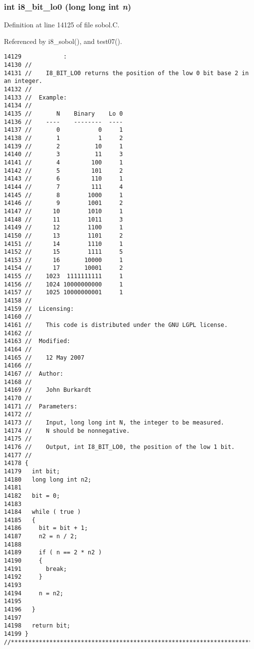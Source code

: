 \subsubsection{\setlength{\rightskip}{0pt plus 5cm}int i8\_\-bit\_\-lo0 (long long int {\em n})}\label{sobol_8C_6f15ee288a7be154bf55768d59ac8124}




Definition at line 14125 of file sobol.C.

Referenced by i8\_\-sobol(), and test07().

\begin{Code}\begin{verbatim}14129            :
14130 //
14131 //    I8_BIT_LO0 returns the position of the low 0 bit base 2 in an integer.
14132 //
14133 //  Example:
14134 //
14135 //       N    Binary    Lo 0
14136 //    ----    --------  ----
14137 //       0           0     1
14138 //       1           1     2
14139 //       2          10     1
14140 //       3          11     3 
14141 //       4         100     1
14142 //       5         101     2
14143 //       6         110     1
14144 //       7         111     4
14145 //       8        1000     1
14146 //       9        1001     2
14147 //      10        1010     1
14148 //      11        1011     3
14149 //      12        1100     1
14150 //      13        1101     2
14151 //      14        1110     1
14152 //      15        1111     5
14153 //      16       10000     1
14154 //      17       10001     2
14155 //    1023  1111111111     1
14156 //    1024 10000000000     1
14157 //    1025 10000000001     1
14158 //
14159 //  Licensing:
14160 //
14161 //    This code is distributed under the GNU LGPL license. 
14162 //
14163 //  Modified:
14164 //
14165 //    12 May 2007
14166 //
14167 //  Author:
14168 //
14169 //    John Burkardt
14170 //
14171 //  Parameters:
14172 //
14173 //    Input, long long int N, the integer to be measured.
14174 //    N should be nonnegative.
14175 //
14176 //    Output, int I8_BIT_LO0, the position of the low 1 bit.
14177 //
14178 {
14179   int bit;
14180   long long int n2;
14181 
14182   bit = 0;
14183 
14184   while ( true )
14185   {
14186     bit = bit + 1;
14187     n2 = n / 2;
14188 
14189     if ( n == 2 * n2 )
14190     {
14191       break;
14192     }
14193 
14194     n = n2;
14195 
14196   }
14197 
14198   return bit;
14199 }
//****************************************************************************80
\end{verbatim}
\end{Code}


